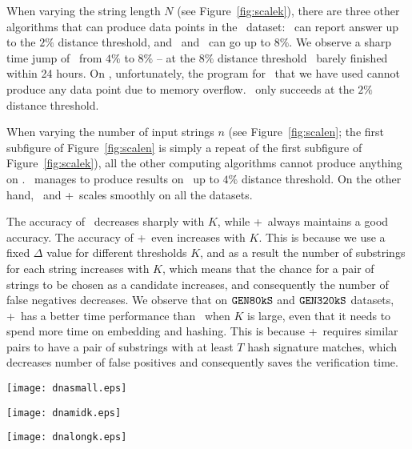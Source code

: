 When varying the string length $N$ (see Figure~\ref{fig:scalek}), there are three other algorithms that can produce data points in the \genob\ dataset: \edjoin\ can report answer up to the $2\%$ distance threshold, and \pass\ and \qchunk\ can go up to $8\%$.  We observe a sharp time jump of \qchunk\  from $4\%$ to $8\%$ -- at the $8\%$ distance threshold \qchunk\ barely finished within 24 hours.  
On \genod, unfortunately, the program for \qchunk\ that we have used cannot produce any data point due to memory overflow.  \pass\ only succeeds at the $2\%$ distance threshold.  

When varying the number of input strings $n$ (see Figure~\ref{fig:scalen}; the first subfigure of Figure~\ref{fig:scalen} is simply a  repeat of the first subfigure of Figure~\ref{fig:scalek}), all the other computing algorithms cannot produce anything on \genof.  \pass\ manages to produce results on \genoe\ up to $4\%$ distance threshold.  On the other hand, \ebdjoin\ and \ebdjoin+\ scales smoothly on all the datasets. 

The accuracy of \ebdjoin\ decreases sharply with $K$, while \ebdjoin+\ always maintains a good accuracy. The accuracy of \ebdjoin+\ even increases with $K$.  This is because we use a fixed $\Delta$ value for different thresholds $K$, and as a result the number of substrings for each string increases with $K$, which means that the chance for a pair of strings to be chosen as a candidate increases, and consequently the number of false negatives decreases.    We observe that on ${\tt GEN80kS}$ and ${\tt GEN320kS}$ datasets, \ebdjoin+\ has a better time performance than \ebdjoin\ when $K$ is large, even that it needs to spend more time on embedding and hashing. This is because \ebdjoin+\ requires similar pairs to have a pair of substrings with at least $T$ hash signature matches, which decreases number of false positives and consequently saves the verification time. 

\begin{figure*}[t]
\centering
\begin{minipage}[d]{0.32\linewidth}
\centering
\texttt{[image: dnasmall.eps]}
\centerline{\genob}
\end{minipage}
\begin{minipage}[d]{0.32\linewidth}
\centering
\texttt{[image: dnamidk.eps]}
\centerline{\genoc}
\end{minipage}
\begin{minipage}[d]{0.32\linewidth}
\centering
\texttt{[image: dnalongk.eps]}
\centerline{\genod}
\end{minipage}
\caption{Scalability on string length. Percentages on the curves for \ebdjoin/\ebdjoin+\  are their accuracy}
\label{fig:scalek}
\end{figure*}

